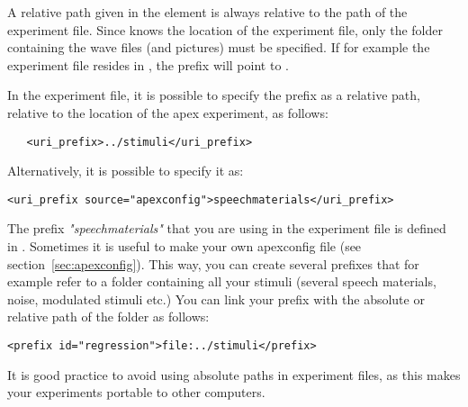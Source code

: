 A relative path given in the  element is
always relative to the path of the experiment file. Since \apex
knows the location of the experiment file, only the folder
containing the wave files (and pictures) must be specified. If for
example the experiment file resides in
, the prefix 
will point to .

In the experiment file, it is possible to specify the prefix as a relative path, relative to the location of the apex experiment, as follows:

\begin{lstlisting}
   <uri_prefix>../stimuli</uri_prefix>
\end{lstlisting}

Alternatively, it is possible to specify it as:

\begin{lstlisting}
<uri_prefix source="apexconfig">speechmaterials</uri_prefix>
\end{lstlisting}

The prefix \emph{"speechmaterials"} that you are using in the experiment file is defined in . Sometimes it is useful to make your own apexconfig file (see section~\ref{sec:apexconfig}). This way, you can create several prefixes that for example refer to a folder containing all your stimuli (several speech materials, noise, modulated stimuli etc.) You can link your prefix with the absolute or relative path of the folder as follows: \\

\begin{lstlisting}
<prefix id="regression">file:../stimuli</prefix>
\end{lstlisting}

It is good practice to avoid using absolute paths in experiment files, as this makes your experiments portable to other computers. 

\label{sec:prefixes}


